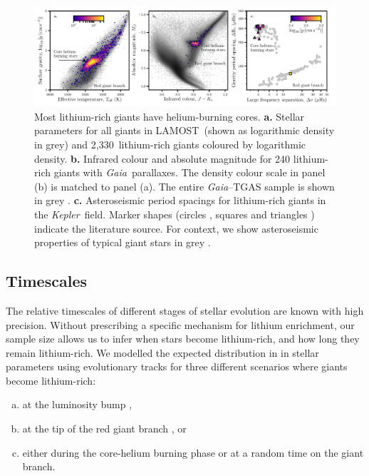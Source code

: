 \documentclass[twocolumn]{aastex62}
\newcommand{\SampleSize}{2,330}
\newcommand\lamost{LAMOST}
\newcommand{\project}[1]{\emph{#1}}
\newcommand{\gaia}{\project{Gaia}}
\newcommand{\kepler}{\project{Kepler}}
\begin{document}
\begin{figure}
	\includegraphics[width=\textwidth]{figure1}
	\caption{
		{Most lithium-rich giants have helium-burning cores.}
		\textbf{a.} Stellar parameters for all giants in \lamost\ (shown as logarithmic density in grey) and \SampleSize\ lithium-rich giants coloured by logarithmic density.
		\textbf{b.} Infrared colour and absolute magnitude for 240 lithium-rich giants
		with \gaia\ parallaxes. The density colour scale in panel (b) is matched to panel (a).
		The entire \gaia--TGAS sample is shown in grey \citep{Gaia-Collaboration_2018,Anderson_2017}.
		\textbf{c.} Asteroseismic period spacings for lithium-rich giants in the
		\kepler\ field.  Marker shapes (circles \citep{Mosser_2012}, squares \citep{Stello_2013} and triangles \citep{Vrard_2016}) indicate the literature source. For context, we show 
		asteroseismic properties of typical giant stars in grey \citep{Mosser_2012}.}
	\label{fig:figure1}
\end{figure}



\subsection{Timescales}

The relative timescales of different stages of stellar evolution are known with
high precision. Without prescribing a specific mechanism for lithium 
enrichment, our sample size allows us to infer when stars become lithium-rich,
and how long they remain lithium-rich. We modelled the expected distribution 
in in stellar parameters using evolutionary tracks \citep{Dotter_2016,Choi_2016}
for three different scenarios where giants become lithium-rich:
\begin{enumerate}[(a)]
	\item at the luminosity bump \citep{Charbonnel_2000},
	\item at the tip of the red giant branch \citep{Lattanzio_2014}, or
	\item either during the core-helium burning phase or at a random time on the giant branch.
\end{enumerate} 
\end{document}
